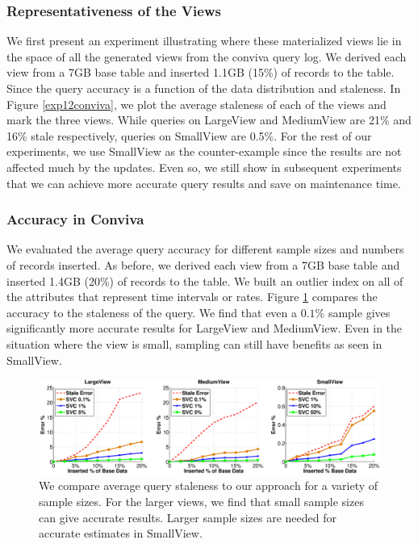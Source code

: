 \subsubsection{Representativeness of the Views}
We first present an experiment illustrating where these materialized views lie in the space of all the generated views from the conviva query log. 
We derived each view from a 7GB base table and inserted 1.1GB (15\%) of records to the table. 
Since the query accuracy is a function of the data distribution and staleness.
In Figure \ref{exp12conviva}, we plot the average staleness of each of the views and mark the three views.
While queries on LargeView and MediumView are 21\% and 16\% stale respectively, queries on SmallView are 0.5\%.
For the rest of our experiments, we use SmallView as the counter-example since the results are not affected much by the updates.
Even so, we still show in subsequent experiments that we can achieve more accurate query results and save on maintenance time.

\subsubsection{Accuracy in Conviva}
We evaluated the average query accuracy for different sample sizes and numbers of records inserted.
As before, we derived each view from a 7GB base table and inserted 1.4GB (20\%) of records to the table. 
We built an outlier index on all of the attributes that represent time intervals or rates.
Figure \ref{exp5conviva} compares the accuracy to the staleness of the query.
We find that even a $0.1\%$ sample gives significantly more accurate results for LargeView and MediumView.
Even in the situation where the view is small, sampling can still have benefits as seen in SmallView.

\begin{figure}[t]\vspace{-1em}
\includegraphics[trim = 45mm 0mm 45mm 0mm, clip,width=\columnwidth]{exp/exp5-coniva-accuracy.eps}\vspace{-.5em}
 \caption{We compare average query staleness to our approach for a variety of sample sizes. For the larger views, we find that small sample sizes can give accurate results. Larger sample sizes are needed for accurate estimates in SmallView. \label{exp5conviva}}\vspace{-.5em}
\end{figure}

